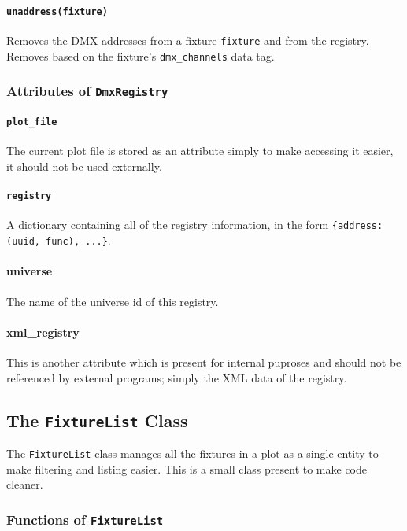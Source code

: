 \documentclass[a4paper]{article}
\begin{document}
\paragraph{\texttt{unaddress(fixture)}}
Removes the DMX addresses from a fixture \texttt{fixture} and from the 
registry. Removes based on the fixture's \texttt{dmx\_channels} data tag.

\subsubsection{Attributes of \texttt{DmxRegistry}}

\paragraph{\texttt{plot\_file}}
The current plot file is stored as an attribute simply to make accessing it 
easier, it should not be used externally.

\paragraph{\texttt{registry}}
A dictionary containing all of the registry information, in the form 
\texttt{\{address: (uuid, func), ...\}}.

\paragraph{universe}
The name of the universe id of this registry.

\paragraph{xml\_registry}
This is another attribute which is present for internal puproses and should 
not be referenced by external programs; simply the XML data of the registry.

\subsection{The \texttt{FixtureList} Class}
The \texttt{FixtureList} class manages all the fixtures in a plot as a single 
entity to make filtering and listing easier. This is a small class present 
to make code cleaner.

\subsubsection{Functions of \texttt{FixtureList}}
\end{document}
